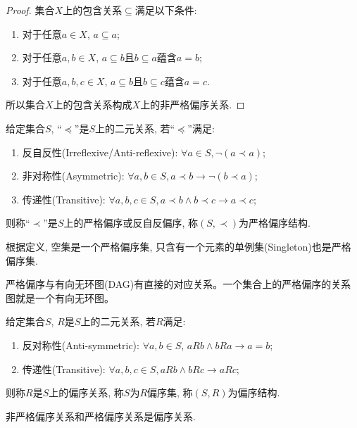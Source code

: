 \begin{proof}
	集合$X$上的包含关系$\subseteq$满足以下条件:
	\begin{enumerate}
		\item 对于任意$a\in X$, $a\subseteq a$;
		\item 对于任意$a,b\in X$, $a\subseteq b$且$b\subseteq a$蕴含$a=b$;
		\item 对于任意$a,b,c\in X$, $a\subseteq b$且$b\subseteq c$蕴含$a=c$.
	\end{enumerate}
	
	所以集合$X$上的包含关系构成$X$上的非严格偏序关系.
\end{proof}

\begin{definition}[严格偏序关系]
	给定集合$S$, ``$\preccurlyeq$''是$S$上的二元关系, 若``$\preccurlyeq$''满足:
	\begin{enumerate}
		\item 反自反性(Irreflexive/Anti-reflexive): $\forall a\in S, \neg(a\prec a)$;
		\item 非对称性(Asymmetric): $\forall a,b\in S, a\prec b\rightarrow\neg(b\prec a)$;
		\item 传递性(Transitive): $\forall a,b,c\in S, a\prec b\wedge b\prec c\rightarrow a\prec c$;
	\end{enumerate}
	则称``$\prec$''是$S$上的严格偏序或反自反偏序, 称$(S,\prec)$为严格偏序结构.
\end{definition}

根据定义, 空集是一个严格偏序集, 只含有一个元素的单例集(Singleton)也是严格偏序集.

严格偏序与有向无环图(DAG)有直接的对应关系。一个集合上的严格偏序的关系图就是一个有向无环图。

\begin{definition}[偏序关系]
	给定集合$S$, $R$是$S$上的二元关系, 若$R$满足:
	\begin{enumerate}
		\item 反对称性(Anti-symmetric): $\forall a,b\in S$, $aRb\wedge bRa\rightarrow a=b$;
		\item 传递性(Transitive): $\forall a,b,c\in S, aRb\wedge bRc\rightarrow aRc$;
	\end{enumerate}
	则称$R$是$S$上的偏序关系, 称$S$为$R$偏序集, 称$(S,R)$为偏序结构.
\end{definition}

\begin{proposition}
	非严格偏序关系和严格偏序关系是偏序关系.
\end{proposition}

